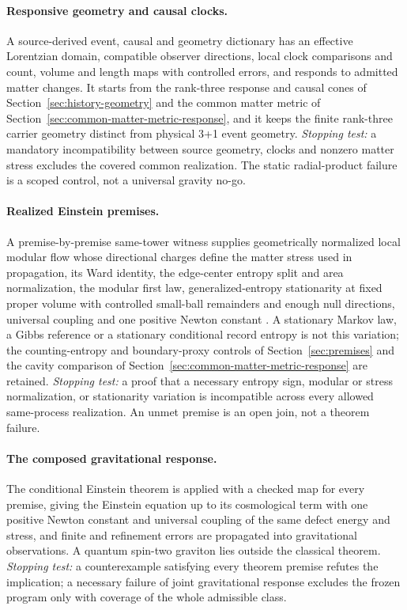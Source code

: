 \documentclass[11pt]{article}
\theoremstyle{definition}
\theoremstyle{remark}
\theoremstyle{plain}
\begin{document}
\paragraph{Responsive geometry and causal clocks.} A source-derived event,
causal and geometry dictionary has an effective Lorentzian domain, compatible
observer directions, local clock comparisons and count, volume and length
maps with controlled errors, and responds to admitted matter changes. It
starts from the rank-three response and causal cones of
Section~\ref{sec:history-geometry} and the common matter metric of
Section~\ref{sec:common-matter-metric-response}, and it keeps the finite
rank-three carrier geometry distinct from physical 3+1 event geometry.
\emph{Stopping test:} a mandatory incompatibility between source geometry,
clocks and nonzero matter stress excludes the covered common realization. The
static radial-product failure is a scoped control, not a universal gravity
no-go.

\paragraph{Realized Einstein premises.} A premise-by-premise same-tower
witness supplies geometrically normalized local modular flow whose
directional charges define the matter stress used in propagation, its Ward
identity, the edge-center entropy split and area normalization, the modular
first law, generalized-entropy stationarity at fixed proper volume with
controlled small-ball remainders and enough null directions, universal
coupling and one positive Newton constant \cite{ophspacetime}. A stationary
Markov law, a Gibbs reference or a stationary conditional record entropy is
not this variation; the counting-entropy and boundary-proxy controls of
Section~\ref{sec:premises} and the cavity comparison of
Section~\ref{sec:common-matter-metric-response} are retained. \emph{Stopping
test:} a proof that a necessary entropy sign, modular or stress
normalization, or stationarity variation is incompatible across every
allowed same-process realization. An unmet premise is an open join, not a
theorem failure.

\paragraph{The composed gravitational response.} The conditional Einstein
theorem is applied with a checked map for every premise, giving the Einstein
equation up to its cosmological term with one positive Newton constant and
universal coupling of the same defect energy and stress, and finite and
refinement errors are propagated into gravitational observations. A quantum
spin-two graviton lies outside the classical theorem. \emph{Stopping test:} a
counterexample satisfying every theorem premise refutes the implication; a
necessary failure of joint gravitational response excludes the frozen
program only with coverage of the whole admissible class.
\end{document}
